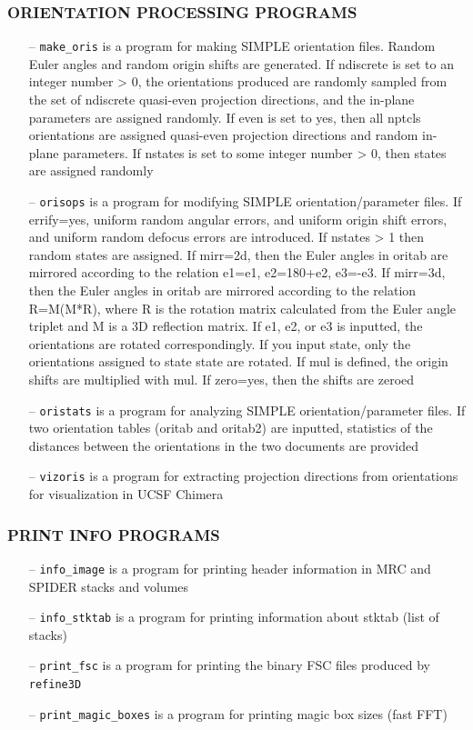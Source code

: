 \documentclass[a4paper,11pt]{article}
\newcommand{\prgname}[1]{\textcolor{NavyBlue}{\texttt{#1}}}
\begin{document}
\subsubsection{ORIENTATION PROCESSING PROGRAMS}
\begin{itemize}
\item[--] \prgname{make\_oris} is a program for making SIMPLE orientation files. Random Euler angles and random origin shifts are generated. If ndiscrete is set to an integer number > 0, the orientations produced are randomly sampled from the set of ndiscrete quasi-even projection directions, and the in-plane parameters are assigned randomly. If even is set to yes, then all nptcls orientations are assigned quasi-even projection directions and  random in-plane parameters. If nstates is set to some integer number > 0, then states are assigned randomly
\item[--] \prgname{orisops} is a program for modifying SIMPLE orientation/parameter files. If errify=yes, uniform random angular errors, and uniform origin shift errors,  and uniform random defocus errors are introduced. If nstates > 1 then random states are assigned. If mirr=2d, then the Euler angles in oritab are mirrored according to the relation e1=e1, e2=180+e2, e3=-e3. If mirr=3d, then the Euler angles in oritab are mirrored according to the relation R=M(M*R), where R is the rotation matrix calculated from the Euler angle triplet and M is a 3D reflection matrix. If e1, e2, or e3 is inputted, the orientations are rotated correspondingly. If you input state, only the orientations assigned to state state are rotated. If mul is defined, the origin shifts are multiplied with mul. If zero=yes, then the shifts are zeroed
\item[--] \prgname{oristats} is a program for analyzing SIMPLE orientation/parameter files. If two orientation tables (oritab and oritab2) are inputted, statistics of the distances between the orientations in the two documents are provided
\item[--] \prgname{vizoris} is a program for extracting projection directions from orientations for visualization in UCSF Chimera
\end{itemize}

\subsubsection{PRINT INFO PROGRAMS}
\begin{itemize}
\item[--] \prgname{info\_image} is a program for printing header information in MRC and SPIDER stacks and volumes
\item[--] \prgname{info\_stktab} is a program for printing information about stktab (list of stacks)
\item[--] \prgname{print\_fsc} is a program for printing the binary FSC files produced by \prgname{refine3D}
\item[--] \prgname{print\_magic\_boxes} is a program for printing magic box sizes (fast FFT)
\end{itemize}
\end{document}
